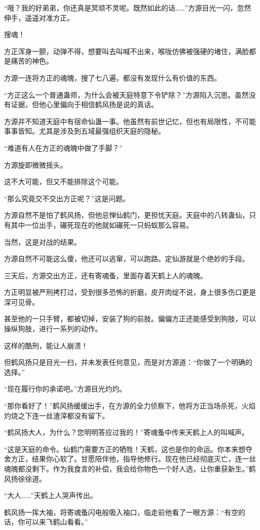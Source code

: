 \begin{this_body}
“哦？我的好弟弟，你还真是冥顽不灵呢。既然如此的话……”方源目光一闪，忽然伸手，遥遥对准方正。

搜魂！

方正浑身一颤，动弹不得，想要叫去叫喊不出来，喉咙仿佛被强硬的堵住，满脸都是痛苦的神色。

方源一连将方正的魂魄，搜了七八遍，都没有发现什么有价值的东西。

“方正这么一个普通蛊师，为什么会被天庭特意下令铲除？”方源陷入沉思。虽然没有证据，但他心里偏向于相信鹤风扬是说的真话。

方源并不知道天庭中有宿命仙蛊一事。他虽然有前世记忆，但也有局限性，不可能事事皆知。尤其是涉及到五域最强组织天庭的隐秘。

“难道有人在方正的魂魄中做了手脚？”

方源旋即微微摇头。

这不大可能，但又不能排除这个可能。

“那么究竟交不交出方正呢？”这是问题。

方源自然不是怕了鹤风扬，但他忌惮仙鹤门，更担忧天庭。天庭中的八转蛊仙，只有其中一位出手，碾死现在的他就如碾死一只蚂蚁那么容易。

当然，这是对战的结果。

方源自然不可能这么傻，他还可以逃窜，可以跑路。定仙游就是个绝妙的手段。

三天后，方源交出方正，还有寄魂蚤，里面存着天鹤上人的魂魄。

方正明显被严刑拷打过，受到很多恐怖的折磨，皮开肉绽不说，身上很多伤口更是深可见骨。

甚至他的一只手臂，都被切掉，安装了狗的前肢。偏偏方正还能感受到狗肢，可以操纵狗肢，进行一系列的动作。

这样的酷刑，能让人崩溃！

但鹤风扬只是目光一扫，并未发表任何意见，而是对方源道：“你做了一个明确的选择。”

“现在履行你的承诺吧。”方源目光灼灼。

“那你看好了！”鹤风扬缓缓出手，在方源的全力侦察下，他将方正当场杀死，火焰灼烧之下连一丝渣滓都没有留下。

“鹤风扬大人，为什么？您明明答应过我的！”寄魂蚤中传来天鹤上人的叫喊声。

“这是天庭的命令。仙鹤门需要方正的牺牲！天鹤，这也是你的命运。你本来想夺舍方正，结果你心软了。甘愿陪伴他，指导他修行。现在他已经彻底灭亡，连一丝魂魄都没剩下。作为我食言的补偿，我会给你物色一个好人选，让你重获新生。”鹤风扬徐徐道。

“大人……”天鹤上人哭声传出。

鹤风扬一挥大袖，将寄魂蚤闪电般吸入袖口，临走前他看了一眼方源：“有空的话，你可以来飞鹤山看看。”

\end{this_body}

